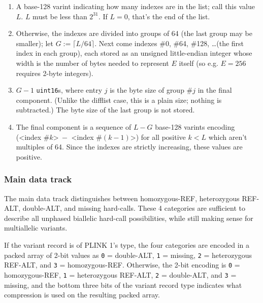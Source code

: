 \documentclass[8pt]{article}
\begin{document}
\begin{enumerate}
\item A base-128 varint indicating how many indexes are in the list; call this
  value $L$.  $L$ must be less than $2^{31}$.  If $L=0$, that's the end of the
  list.
\item Otherwise, the indexes are divided into groups of 64 (the last group may
  be smaller); let $G:=\lceil L/64\rceil $.  Next come indexes \#0, \#64,
  \#128, \ldots (the first index in each group), each stored as an unsigned
  little-endian integer whose width is the number of bytes needed to represent
  $E$ itself (so e.g. $E=256$ requires 2-byte integers).
\item $G-1$ \texttt{uint16}s, where entry $j$ is the byte size of group \#$j$
  in the final component.  (Unlike the difflist case, this is a plain size;
  nothing is subtracted.)  The byte size of the last group is not stored.
\item The final component is a sequence of $L-G$ base-128 varints encoding
  (\textless index \#$k$\textgreater $\>-$ \textless index
  \#$(k-1)$\textgreater) for all positive $k<L$ which aren't multiples of 64.
  Since the indexes are strictly increasing, these values are positive.
\end{enumerate}

\subsubsection{Main data track}

The main data track distinguishes between homozygous-REF, heterozygous REF-ALT,
double-ALT, and missing hard-calls.  These 4 categories are sufficient to
describe all unphased biallelic hard-call possibilities, while still making
sense for multiallelic variants.

If the variant record is of PLINK 1's type, the four categories are encoded in
a packed array of 2-bit values as \texttt{0} = double-ALT, \texttt{1} =
missing, \texttt{2} = heterozygous REF-ALT, and \texttt{3} = homozygous-REF.
Otherwise, the 2-bit encoding is \texttt{0} = homozygous-REF, \texttt{1} =
heterozygous REF-ALT, \texttt{2} = double-ALT, and \texttt{3} = missing, and
the bottom three bits of the variant record type indicates what compression is
used on the resulting packed array.
\end{document}
